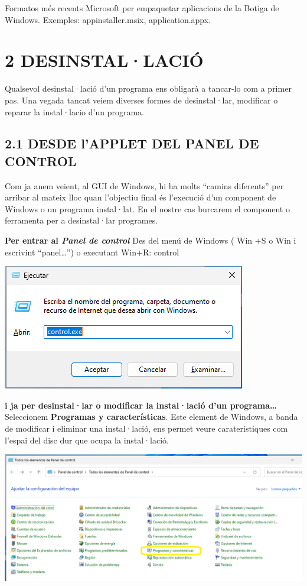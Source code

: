 \documentclass[
  a4paper,
]{article}
\begin{document}
Formatos més recents Microsoft per empaquetar aplicacions de la Botiga
de Windows. Exemples: appinstaller.msix, application.appx.

\section{2 DESINSTAL·LACIÓ}\label{desinstallaciuxf3}

Qualsevol desinstal·lació d'un programa ens obligarà a tancar-lo com a
primer pas. Una vegada tancat veiem diverses formes de desinstal·lar,
modificar o reparar la instal·lacio d'un programa.

\subsection{2.1 DESDE l'APPLET DEL PANEL DE
CONTROL}\label{desde-lapplet-del-panel-de-control}

Com ja anem veient, al GUI de Windows, hi ha molts ``camins diferents''
per arribar al mateix lloc quan l'objectiu final és l'execució d'un
component de Windows o un programa instal·lat. En el nostre cas burcarem
el component o ferramenta per a desinstal·lar programes.

\textbf{Per entrar al \emph{Panel de control} } Des del menú de Windows
( Win +S o Win i escrivint ``panel\ldots{}'') o executant Win+R: control

\includegraphics{png/control-exe.png}

\textbf{i ja per desinstal·lar o modificar la instal·lació d'un
programa\ldots{}} Seleccionem \textbf{Programas y características}. Este
element de Windows, a banda de modificar i eliminar una instal·lació,
ens permet veure caraterístiques com l'espai del disc dur que ocupa la
instal·lació.

\includegraphics{png/paneldeControl.png}
\end{document}

